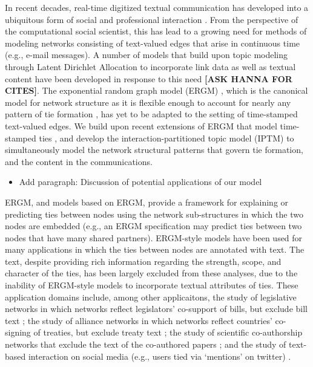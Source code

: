 \documentclass[a4paper]{article}
\begin{document}
In recent decades, real-time digitized textual communication has developed into a ubiquitous form of social and professional interaction \citep[see, e.g.,][]{kanungo2008modeling, szostek2011dealing, burgess2004email, pew2016}. From the perspective of the computational social scientist, this has lead to a growing need for methods of modeling networks consisting of text-valued edges that arise in continuous time (e.g., e-mail messages). A number of models that build upon topic modeling through Latent Dirichlet Allocation \citep{Blei2003} to incorporate link data as well as textual content have been developed in response to this need {\bf [ASK HANNA FOR CITES]}.  The exponential random graph model (ERGM) \citep{robins2007introduction,chatterjee2013estimating,hunter2008ergm}, which is the canonical model for network structure as it is flexible enough to account for nearly any pattern of tie formation \citep{desmarais2017statistical}, has yet to be adapted to the setting of time-stamped text-valued edges. We build upon recent extensions of ERGM that model time-stamped ties \citep{PerryWolfe2012,Butts2008}, and develop the interaction-partitioned topic model (IPTM) to simultaneously model the network structural patterns that govern tie formation, and the content in the communications.


\begin{itemize}
\item Add paragraph: Discussion of potential applications of our model
\end{itemize}

ERGM, and models based on ERGM, provide a framework for explaining or predicting ties between nodes using the network sub-structures in which the two nodes are embedded (e.g., an ERGM specification may predict ties between two nodes that have many shared partners). ERGM-style models have been used for many applications in which the ties between nodes are annotated with text. The text, despite providing rich information regarding the strength, scope, and character of the ties, has been largely excluded from these analyses, due to the inability of ERGM-style models to incorporate textual attributes of ties. These application domains include, among other applicaitons, the study of legislative networks in which networks reflect legislators' co-support of bills, but exclude bill text \citep{bratton2011networks,aleman2013explaining}; the study of alliance networks in which networks reflect countries' co-signing of treaties, but exclude treaty text \citep{camber2010geometry,cranmer2012complex,cranmer2012toward,kinne2016agreeing}; the study of scientific co-authorship networks that exclude the text of the co-authored papers \citep{kronegger2011collaboration,liang2015changing,ahmy2016gender}; and the study of text-based interaction on social media (e.g., users tied via `mentions' on twitter) \citep{yoon2014strategies,peng2016follower,lai2017connecting}.
\end{document}

